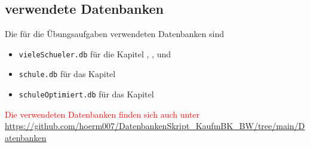 \subsection[verwendete Datenbanken]{verwendete Datenbanken}
Die für die Übungsaufgaben verwendeten Datenbanken sind
\begin{itemize}
	\item \lstinline!vieleSchueler.db! für die Kapitel ,  ,  und 
	\item \lstinline!schule.db! für das Kapitel 
	\item \lstinline!schuleOptimiert.db! für das Kapitel 
\end{itemize}
\textcolor{red}{Die verwendeten Datenbanken finden sich auch unter
    {\small\href{https://github.com/hoerm007/DatenbankenSkript\_KaufmBK\_BW/tree/main/Datenbanken}{https://github.com/hoerm007/DatenbankenSkript\_KaufmBK\_BW/tree/main/Datenbanken}}}
